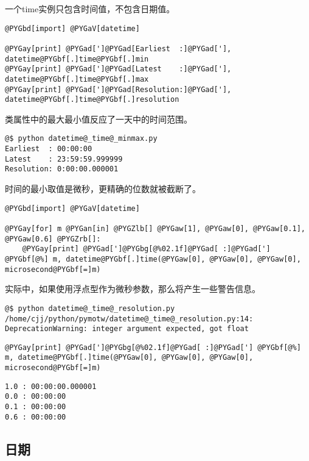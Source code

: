 \documentclass[letterpaper,10pt,english]{manual}
\begin{document}
一个time实例只包含时间值，不包含日期值。

\begin{Verbatim}[commandchars=@\[\]]
@PYGbd[import] @PYGaV[datetime]

@PYGay[print] @PYGad[']@PYGad[Earliest  :]@PYGad['], datetime@PYGbf[.]time@PYGbf[.]min
@PYGay[print] @PYGad[']@PYGad[Latest    :]@PYGad['], datetime@PYGbf[.]time@PYGbf[.]max
@PYGay[print] @PYGad[']@PYGad[Resolution:]@PYGad['], datetime@PYGbf[.]time@PYGbf[.]resolution
\end{Verbatim}

类属性中的最大最小值反应了一天中的时间范围。

\begin{Verbatim}[commandchars=@\[\]]
@$ python datetime@_time@_minmax.py
Earliest  : 00:00:00
Latest    : 23:59:59.999999
Resolution: 0:00:00.000001
\end{Verbatim}

时间的最小取值是微秒，更精确的位数就被截断了。

\begin{Verbatim}[commandchars=@\[\]]
@PYGbd[import] @PYGaV[datetime]

@PYGay[for] m @PYGan[in] @PYGZlb[] @PYGaw[1], @PYGaw[0], @PYGaw[0.1], @PYGaw[0.6] @PYGZrb[]:
    @PYGay[print] @PYGad[']@PYGbg[@%02.1f]@PYGad[ :]@PYGad['] @PYGbf[@%] m, datetime@PYGbf[.]time(@PYGaw[0], @PYGaw[0], @PYGaw[0], microsecond@PYGbf[=]m)
\end{Verbatim}

实际中，如果使用浮点型作为微秒参数，那么将产生一些警告信息。

\begin{Verbatim}[commandchars=@\[\]]
@$ python datetime@_time@_resolution.py
/home/cjj/python/pymotw/datetime@_time@_resolution.py:14: DeprecationWarning: integer argument expected, got float
\end{Verbatim}

\begin{Verbatim}[commandchars=@\[\]]
@PYGay[print] @PYGad[']@PYGbg[@%02.1f]@PYGad[ :]@PYGad['] @PYGbf[@%] m, datetime@PYGbf[.]time(@PYGaw[0], @PYGaw[0], @PYGaw[0], microsecond@PYGbf[=]m)
\end{Verbatim}

\begin{Verbatim}[commandchars=@\[\]]
1.0 : 00:00:00.000001
0.0 : 00:00:00
0.1 : 00:00:00
0.6 : 00:00:00
\end{Verbatim}


\subsection{日期}
\end{document}
